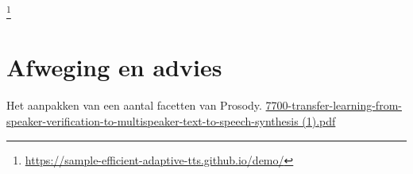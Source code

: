 \cite{chen2018sample}
\footnote{\url{https://sample-efficient-adaptive-tts.github.io/demo/}}

\section{Afweging en advies}

Het aanpakken van een aantal facetten van Prosody.
\url{7700-transfer-learning-from-speaker-verification-to-multispeaker-text-to-speech-synthesis (1).pdf}